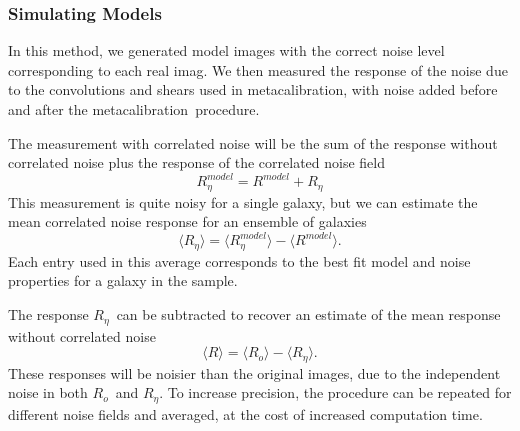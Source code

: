 \documentclass[usegraphicx,usenatbib]{mn2e}
\newcommand{\mcal}{metacalibration}
\newcommand{\mcalR}{$R$}
\newcommand{\mcalRo}{$R_o$}
\newcommand{\mcalRnoise}{$R_\eta$}
\newcommand{\mcalRmodel}{$R^{model}$}
\newcommand{\mcalRnoisemodel}{$R^{model}_\eta$}
\begin{document}
\subsubsection{Simulating Models}

In this method, we generated model images with the correct noise level corresponding
to each real imag.  We then measured the response of the noise due to the
convolutions and shears used in \mcal, with noise added before and
after the \mcal\ procedure.

The measurement with correlated noise will be the sum of the response
without correlated noise plus the response of the correlated noise field
\begin{equation}
    \mbox{\mcalRnoisemodel} = \mbox{\mcalRmodel} + \mbox{\mcalRnoise}
\end{equation}
This measurement is quite noisy for a single galaxy, but we
can estimate the mean correlated noise response for an ensemble
of galaxies
\begin{equation}
    \langle \mbox{\mcalRnoise} \rangle = \langle \mbox{\mcalRnoisemodel} \rangle - \langle \mbox{\mcalRmodel} \rangle.
\end{equation}
Each entry used in this average corresponds to the best fit model
and noise properties for a galaxy in the sample.

The response \mcalRnoise\ can be subtracted to recover an estimate of the mean
response without correlated noise
\begin{equation}
    \langle \mbox{\mcalR} \rangle = \langle \mbox{\mcalRo} \rangle - \langle \mbox{\mcalRnoise} \rangle.
\end{equation}
These responses will be noisier than the original images, due to the
independent noise in both \mcalRo\ and \mcalRnoise.  To increase
precision, the procedure can be repeated for different noise fields
and averaged, at the cost of increased computation time.




\end{document}
